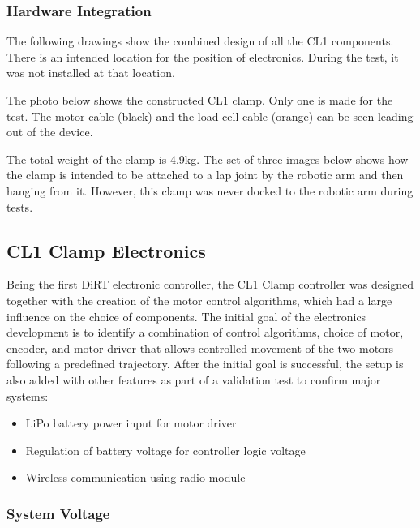 \subsubsection{Hardware Integration}
\label{subsubsection:exploration_1_hardware_integration}

The following drawings show the combined design of all the CL1 components. There is an intended location for the position of electronics. During the test, it was not installed at that location.


The photo below shows the constructed CL1 clamp. Only one is made for the test. The motor cable (black) and the load cell cable (orange) can be seen leading out of the device.

The total weight of the clamp is 4.9kg.
The set of three images below shows how the clamp is intended to be attached to a lap joint by the robotic arm and then hanging from it. However, this clamp was never docked to the robotic arm during tests.


\subsection{CL1 Clamp Electronics}
\label{subsection:exploration_1_cl1_clamp_electronics}

Being the first DiRT electronic controller, the CL1 Clamp controller was designed together with the creation of the motor control algorithms, which had a large influence on the choice of components. The initial goal of the electronics development is to identify a combination of control algorithms, choice of motor, encoder, and motor driver that allows controlled movement of the two motors following a predefined trajectory.
After the initial goal is successful, the setup is also added with other features as part of a validation test to confirm major systems:

\begin{itemize}
    \item LiPo battery power input for motor driver
    \item Regulation of battery voltage for controller logic voltage
    \item Wireless communication using radio module
\end{itemize}

\subsubsection{System Voltage}
\label{subsubsection:exploration_1_system_voltage}

